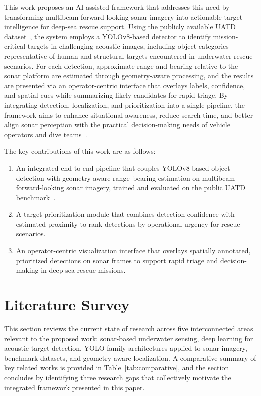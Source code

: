 \documentclass[conference]{IEEEtran}
\begin{document}
This work proposes an AI-assisted framework that addresses this need by transforming multibeam forward-looking sonar imagery into actionable target intelligence for deep-sea rescue support. Using the publicly available UATD dataset~\cite{ref10}, the system employs a YOLOv8-based detector to identify mission-critical targets in challenging acoustic images, including object categories representative of human and structural targets encountered in underwater rescue scenarios. For each detection, approximate range and bearing relative to the sonar platform are estimated through geometry-aware processing, and the results are presented via an operator-centric interface that overlays labels, confidence, and spatial cues while summarizing likely candidates for rapid triage. By integrating detection, localization, and prioritization into a single pipeline, the framework aims to enhance situational awareness, reduce search time, and better align sonar perception with the practical decision-making needs of vehicle operators and dive teams~\cite{ref1}.

The key contributions of this work are as follows:
\begin{enumerate}
    \item An integrated end-to-end pipeline that couples YOLOv8-based object detection with geometry-aware range--bearing estimation on multibeam forward-looking sonar imagery, trained and evaluated on the public UATD benchmark~\cite{ref10}.
    \item A target prioritization module that combines detection confidence with estimated proximity to rank detections by operational urgency for rescue scenarios.
    \item An operator-centric visualization interface that overlays spatially annotated, prioritized detections on sonar frames to support rapid triage and decision-making in deep-sea rescue missions.
\end{enumerate}

\section{Literature Survey}

This section reviews the current state of research across five interconnected areas relevant to the proposed work: sonar-based underwater sensing, deep learning for acoustic target detection, YOLO-family architectures applied to sonar imagery, benchmark datasets, and geometry-aware localization. A comparative summary of key related works is provided in Table~\ref{tab:comparative}, and the section concludes by identifying three research gaps that collectively motivate the integrated framework presented in this paper.
\end{document}
